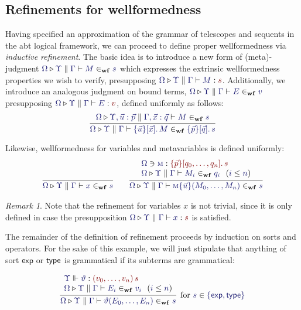 \documentclass[11pt]{article}
\theoremstyle{definition}
\theoremstyle{remark}
\newtheorem{remark}[thm]{Remark}
\numberwithin{equation}{section}
\def\IModeColorName{MidnightBlue}
\def\OModeColorName{Maroon}
\newcommand\IMode[1]{{\color{\IModeColorName}{#1}}}
\newcommand\OMode[1]{{\color{\OModeColorName}{#1}}}
\newcommand\HypJ[2]{#1\ \ (#2)}
\newcommand\MkSet[1]{\left\{#1\right\}}
\newcommand\Member[2]{\IMode{#1}\in\IMode{#2}}
\newcommand\MkValence[3]{%
  \ifthenelse{\equal{#1}{}}{}{%
    \{#1\}%
  }%
  \ifthenelse{\equal{#2}{}}{}{%
    [#2]%
  }.\, #3%
}
\newcommand\MkBTm[3]{\{#1\}[#2].\, #3}
\newcommand\MkArity[2]{(#1)\, #2}
\newcommand\Leq[2]{\IMode{#1}\leq\IMode{#2}}
\newcommand\IsOperator[3]{\IMode{#1}\Vdash\IMode{#2}: \OMode{#3}}
\newcommand\Lookup[3]{\IMode{#1}\ni\IMode{#2}:\OMode{#3}}
\newcommand\IsAbt[5]{%
  \IMode{#1}\triangleright%
  \IMode{#2}\parallel%
  \IMode{#3}\vdash%
  \IMode{#4}:\OMode{#5}%
}
\newcommand\IsWf[5]{%
  \IMode{#1}\triangleright%
  \IMode{#2}\parallel%
  \IMode{#3}\vdash%
  \IMode{#4}\in_{\mathbf{wf}}\IMode{#5}%
}
\newcommand\MV[1]{\textsc{#1}}
\newcommand\MApp[3]{#1\{#2\}(#3)}
\newcommand\App[2]{#1(#2)}
\newcommand\SortExp{\mathsf{exp}}
\begin{document}
\subsection{Refinements for wellformedness}

Having specified an approximation of the grammar of telescopes and sequents in
the abt logical framework, we can proceed to define proper wellformedness via
\emph{inductive refinement}. The basic idea is to introduce a new form of
(meta)-judgment $\IsWf{\Omega}{\Upsilon}{\Gamma}{M}{s}$ which expresses the
extrinsic wellformedness properties we wish to verify, presupposing
$\IsAbt{\Omega}{\Upsilon}{\Gamma}{M}{s}$. Additionally, we introduce an
analogous judgment on bound terms, $\IsWf{\Omega}{\Upsilon}{\Gamma}{E}{v}$
presupposing $\IsAbt{\Omega}{\Upsilon}{\Gamma}{E}{v}$, defined uniformly as
follows:
\[
  \infer{
    \IsWf{\Omega}{\Upsilon}{\Gamma}{
      \MkBTm{\vec{u}}{\vec{x}}{M}
    }{
      \MkValence{\vec{p}}{\vec{q}}{s}
    }
  }{
    \IsWf{\Omega}{\Upsilon,\vec{u}:\vec{p}}{\Gamma,\vec{x}:\vec{q}}{M}{s}
  }
\]

Likewise, wellformedness for variables and metavariables is defined uniformly:
\begin{gather*}
  \infer{
    \IsWf{\Omega}{\Upsilon}{\Gamma}{x}{s}
  }{
  }\qquad
  \infer{
    \IsWf{\Omega}{\Upsilon}{\Gamma}{
      \MApp{\MV{m}}{\vec{u}}{M_0,\dots,M_n}
    }{s}
  }{
    \begin{array}{l}
      \Lookup{\Omega}{\MV{m}}{\MkValence{\vec{p}}{q_0,\dots,q_n}{s}}\\
      \HypJ{
        \IsWf{\Omega}{\Upsilon}{\Gamma}{M_i}{q_i}
      }{
        \Leq{i}{n}
      }
    \end{array}
  }
\end{gather*}

\begin{remark}
  Note that the refinement for variables $x$ is not trivial, since it is only
  defined in case the presupposition $\IsAbt{\Omega}{\Upsilon}{\Gamma}{x}{s}$
  is satisfied.
\end{remark}

The remainder of the definition of refinement proceeds by induction on sorts
and operators. For the sake of this example, we will just stipulate that
anything of sort $\SortExp$ or $\mathsf{type}$ is grammatical if its subterms are
grammatical:

\[
  \infer[
    \text{for $\Member{s}{\MkSet{\SortExp,\SortType}}$}
  ]{
    \IsWf{\Omega}{\Upsilon}{\Gamma}{
      \App{\vartheta}{E_0,\dots,E_n}
    }{s}
  }{
    \begin{array}{l}
      \IsOperator{\Upsilon}{\vartheta}{
        \MkArity{
          v_0,\dots,v_n
        }{s}
      }\\
      \HypJ{
        \IsWf{\Omega}{\Upsilon}{\Gamma}{E_i}{v_i}
      }{
        \Leq{i}{n}
      }
    \end{array}
  }
\]
\end{document}
